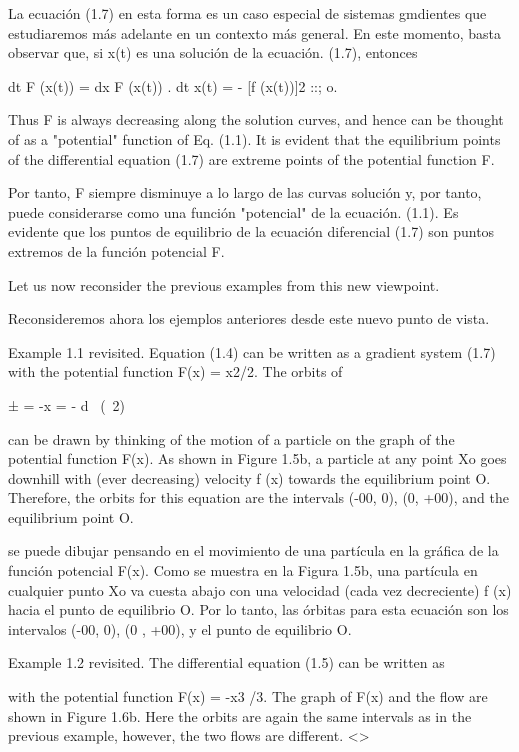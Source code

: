 \documentclass[]{article}
\begin{document}
{La ecuación (1.7) en esta forma es un caso especial de sistemas gmdientes que estudiaremos más adelante en un contexto más general. En este momento, basta observar que, si x(t) es una solución de la ecuación. (1.7), entonces

dt F (x(t)) = dx F (x(t)) . dt x(t) = - [f (x(t))]2 ::; o.

Thus F is always decreasing along the solution curves, and hence can be thought of as a "potential" function of Eq. (1.1). It is evident that the equilibrium points of the differential equation (1.7) are extreme points of the potential function F.

Por tanto, F siempre disminuye a lo largo de las curvas solución y, por tanto, puede considerarse como una función "potencial" de la ecuación. (1.1). Es evidente que los puntos de equilibrio de la ecuación diferencial (1.7) son puntos extremos de la función potencial F.

Let us now reconsider the previous examples from this new viewpoint.

Reconsideremos ahora los ejemplos anteriores desde este nuevo punto de vista.

Example 1.1 revisited. Equation (1.4) can be written as a gradient system (1.7) with the potential function F(x) = x2/2. The orbits of

± = -x = - d~ (~2)

can be drawn by thinking of the motion of a particle on the graph of the potential function F(x). As shown in Figure 1.5b, a particle at any point Xo goes downhill with (ever decreasing) velocity f (x) towards the equilibrium point O. Therefore, the orbits for this equation are the intervals (-00, 0), (0, +00), and the equilibrium point O. 

se puede dibujar pensando en el movimiento de una partícula en la gráfica de la función potencial F(x). Como se muestra en la Figura 1.5b, una partícula en cualquier punto Xo va cuesta abajo con una velocidad (cada vez decreciente) f (x) hacia el punto de equilibrio O. Por lo tanto, las órbitas para esta ecuación son los intervalos (-00, 0), (0 , +00), y el punto de equilibrio O.

Example 1.2 revisited. The differential equation (1.5) can be written as


with the potential function F(x) = -x3 /3. The graph of F(x) and the flow are shown in Figure 1.6b. Here the orbits are again the same intervals as in the previous example, however, the two flows are different. <>

}
\end{document}
